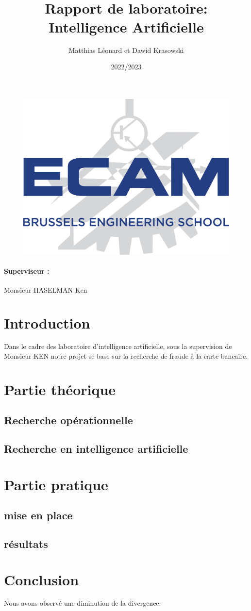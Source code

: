\documentclass{article}
\title{Rapport de laboratoire: \\Intelligence Artificielle}
\author{Matthias Léonard et Dawid Krasowski}
\date{2022/2023}
\begin{document}
\maketitle

\begin{figure}[h]
    \centering
    \includegraphics[scale=0.15]{./images/Logo ECAM.png}

\end{figure}


\paragraph{Superviseur :} Monsieur HASELMAN Ken



\pagebreak
\tableofcontents
\pagebreak
\section{Introduction}
Dans le cadre des laboratoire d'intelligence artificielle,
 sous la supervision de Monsieur KEN notre projet se base sur la recherche de fraude à la carte bancaire.
\section{Partie théorique}
\subsection{Recherche opérationnelle}
\subsection{Recherche en intelligence artificielle}
\section{Partie pratique}
\subsection{mise en place}
\subsection{résultats}
\section{Conclusion}
Nous avons observé une diminution de la divergence.
\end{document}
